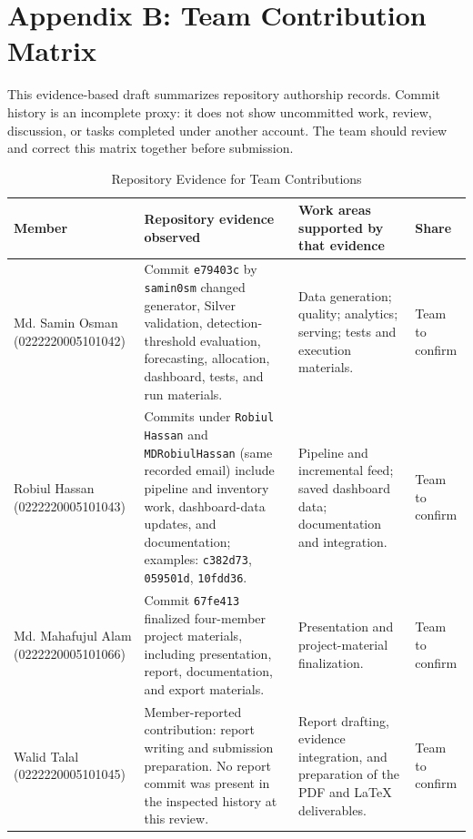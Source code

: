 ﻿\documentclass[conference]{IEEEtran}
\begin{document}
\appendices
% 

\section*{Appendix B: Team Contribution Matrix}
This evidence-based draft summarizes repository authorship records. Commit history is an incomplete proxy: it does not show uncommitted work, review, discussion, or tasks completed under another account. The team should review and correct this matrix together before submission.

\begin{table}[htbp]
\caption{Repository Evidence for Team Contributions}
\centering\small
\renewcommand{\arraystretch}{1.18}
\begin{tabularx}{\textwidth}{p{3.0cm}X p{4.0cm}p{2.0cm}}
\toprule
Member & Repository evidence observed & Work areas supported by that evidence & Share \\
\midrule
Md. Samin Osman (0222220005101042) & Commit \texttt{e79403c} by \texttt{samin0sm} changed generator, Silver validation, detection-threshold evaluation, forecasting, allocation, dashboard, tests, and run materials. & Data generation; quality; analytics; serving; tests and execution materials. & Team to confirm \\
Robiul Hassan (0222220005101043) & Commits under \texttt{Robiul Hassan} and \texttt{MDRobiulHassan} (same recorded email) include pipeline and inventory work, dashboard-data updates, and documentation; examples: \texttt{c382d73}, \texttt{059501d}, \texttt{10fdd36}. & Pipeline and incremental feed; saved dashboard data; documentation and integration. & Team to confirm \\
Md. Mahafujul Alam (0222220005101066) & Commit \texttt{67fe413} finalized four-member project materials, including presentation, report, documentation, and export materials. & Presentation and project-material finalization. & Team to confirm \\
Walid Talal (0222220005101045) & Member-reported contribution: report writing and submission preparation. No report commit was present in the inspected history at this review. & Report drafting, evidence integration, and preparation of the PDF and LaTeX deliverables. & Team to confirm \\
\bottomrule
\end{tabularx}
\end{table}
\end{document}
